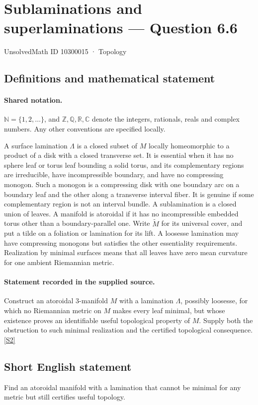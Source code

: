 \documentclass[11pt]{article}
\newcommand{\sref}[2]{\hyperlink{source:#1:#2}{[S#2]}}
\begin{document}
\setcounter{section}{10300014}
\section{Sublaminations and superlaminations — Question 6.6}\label{10300015}
{\small\sffamily UnsolvedMath ID 10300015 · Topology}
\subsection{Definitions and mathematical statement}

\paragraph{Shared notation.}$\mathbb N=\{1,2,\ldots\}$, and $\mathbb Z,\mathbb Q,\mathbb R,\mathbb C$ denote the integers, rationals, reals and complex numbers. Any other conventions are specified locally.


A surface lamination $\Lambda$ is a closed subset of $M$ locally homeomorphic to a product of a disk with a closed transverse set. It is essential when it has no sphere leaf or torus leaf bounding a solid torus, and its complementary regions are irreducible, have incompressible boundary, and have no compressing monogon. Such a monogon is a compressing disk with one boundary arc on a boundary leaf and the other along a transverse interval fiber. It is genuine if some complementary region is not an interval bundle. A sublamination is a closed union of leaves. A manifold is atoroidal if it has no incompressible embedded torus other than a boundary-parallel one. Write $\widetilde M$ for its universal cover, and put a tilde on a foliation or lamination for its lift. A loosesse lamination may have compressing monogons but satisfies the other essentiality requirements. Realization by minimal surfaces means that all leaves have zero mean curvature for one ambient Riemannian metric.
\paragraph{Statement recorded in the supplied source.}
Construct an atoroidal $3$-manifold $M$ with a lamination $\Lambda$, possibly loosesse, for which no Riemannian metric on $M$ makes every leaf minimal, but whose existence proves an identifiable useful topological property of $M$. Supply both the obstruction to such minimal realization and the certified topological consequence. \sref{10300015}{2}
\subsection{Short English statement}
Find an atoroidal manifold with a lamination that cannot be minimal for any metric but still certifies useful topology.
\end{document}
